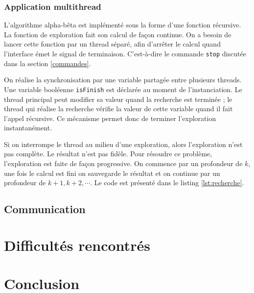 \documentclass{article}
\begin{document}
\subsubsection{Application multithread}
\par L'algorithme alpha-bêta est implémenté sous la forme d'une fonction récursive. La fonction de exploration fait son calcul de façon continue. On a besoin de lancer cette fonction par un thread séparé, afin d'arrêter le calcul quand l'interface émet le signal de terminaison. C'est-à-dire le commande \texttt{stop} discutée dans la section \ref{commandes}.

\par On réalise la synchronisation par une variable partagée entre plusieurs threads. Une variable booléenne \texttt{isFinish} est déclarée au moment de l'instanciation. Le thread principal peut modifier sa valeur quand la recherche est terminée ; le thread qui réalise la recherche vérifie la valeur de cette variable quand il fait l'appel récursive. Ce mécanisme permet donc de terminer l'exploration instantanément.

\par Si on interrompe le thread au milieu d'une exploration, alors l'exploration n'est pas complète. Le résultat n'est pas fidèle. Pour résoudre ce problème, l'exploration est faite de façon progressive. On commence par un profondeur de $k$, une fois le calcul est fini on sauvegarde le résultat et on continue par un profondeur de $k+1, k+2, \cdots$. Le code est présenté dans le listing \ref{lst:recherche}.

\subsection{Communication}

\section{Difficultés rencontrés}

\section{Conclusion}

\clearpage


\end{document}
